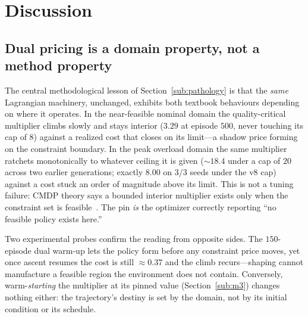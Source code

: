 \section{Discussion}\label{sec:discussion}

\subsection{Dual pricing is a domain property, not a method property}
The central methodological lesson of Section~\ref{sub:pathology} is that
the \emph{same} Lagrangian machinery, unchanged, exhibits both textbook
behaviours depending on where it operates. In the near-feasible nominal
domain the quality-critical multiplier climbs slowly and stays interior
($3.29$ at episode $500$, never touching its cap of $8$) against a realized
cost that closes on its limit---a shadow price forming on the constraint
boundary. In the peak overload domain the same multiplier ratchets
monotonically to whatever ceiling it is given ($\sim\!18.4$ under a cap of
$20$ across two earlier generations; exactly $8.00$ on $3/3$ seeds under
the v8 cap) against a cost stuck an order of magnitude above its limit.
This is not a tuning failure: CMDP theory says a bounded interior
multiplier exists only when the constraint set is
feasible~\cite{altman1999constrained,chow2017risk}. The pin \emph{is} the
optimizer correctly reporting ``no feasible policy exists here.''

Two experimental probes confirm the reading from opposite sides. The
$150$-episode dual warm-up lets the policy form before any constraint
price moves, yet once ascent resumes the cost is still $\approx\!0.37$ and
the climb recurs---shaping cannot manufacture a feasible region the
environment does not contain. Conversely, warm-\emph{starting} the
multiplier at its pinned value (Section~\ref{sub:m3}) changes nothing
either: the trajectory's destiny is set by the domain, not by its initial
condition or its schedule.

